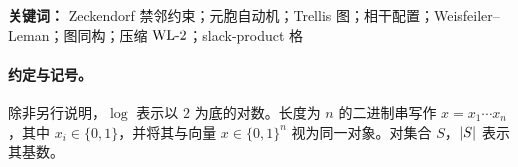 
\begin{abstract}
本文研究一个完全离散且自足的“折叠—时间”系统：将长度为 $n$ 的二进制微观态集合 $\Xn=\{0,1\}^n$ 通过局部元胞规则折叠到满足禁邻约束（不含子串 $11$）的宏观稳定态集合 $\Zn$。当 $n=6$ 时，$\abs{\Xn}=64$，$\abs{\Zn}=21$。折叠会丢失信息，但丢失部分可组织为可计算的 slack 向量，从而得到微观态的可逆分解
$$
\text{micro}\ \cong\ (\text{macro},\text{time}).
$$
在此基础上，我们构造同时包含“折叠边”和“时间边”的 trellis 图 $G_n$，并证明其诱导的宏观加权动力学 $Q_n$ 具有闭式边权公式。我们进一步将 $\WLTWO$ 的稳定染色提升为相干配置，并提出一种基于 slack-product 格结构的“压缩版 $\WLTWO$”，在不展开微观态的情况下复现宏观 $\WLTWO$ 的稳定划分。最后，我们给出一组严格的“搜索复杂度”函数族（纤维大小、时间信息量、最坏时间深度）来刻画折叠后的逆向不确定性与 $\WL$ 稳定深度之间的关系。
\end{abstract}

\begin{sloppypar}
\textbf{关键词：} Zeckendorf 禁邻约束；元胞自动机；Trellis 图；相干配置；Weisfeiler--Leman；图同构；压缩 $\WLTWO$；slack-product 格
\end{sloppypar}

\paragraph{约定与记号。}
除非另行说明，$\log$ 表示以 $2$ 为底的对数。长度为 $n$ 的二进制串写作 $x=x_1\cdots x_n$，其中 $x_i\in\{0,1\}$，并将其与向量 $x\in\{0,1\}^n$ 视为同一对象。对集合 $S$，$\left\lvert S\right\rvert$ 表示其基数。

